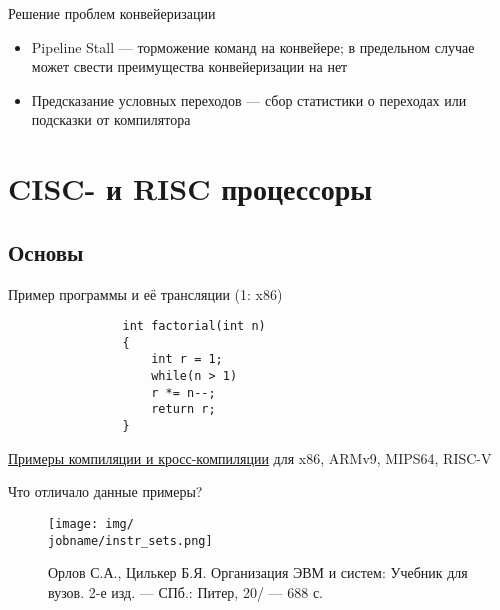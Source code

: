 \documentclass[xetex,aspectratio=43]{beamer}
\begin{document}
\begin{frame}{Решение проблем конвейеризации}
    \begin{itemize}
        \item Pipeline Stall — торможение команд на конвейере; в предельном случае может свести преимущества конвейеризации на нет
        \item Предсказание условных переходов — сбор статистики о переходах или подсказки от компилятора
    \end{itemize}
\end{frame}

\section{CISC- и RISC процессоры}

\subsection{Основы}

\begin{frame}[fragile]{Пример программы и её трансляции (1: x86)}
    \begin{center}
        \begin{minipage}{0.4\linewidth}
            \begin{verbatim}
                int factorial(int n)
                {
                    int r = 1;
                    while(n > 1)
                    r *= n--;
                    return r;
                }
            \end{verbatim}
        \end{minipage}
    \end{center}

\href{https://github.com/dluciv/Computer_Architecture-SPbU-CB.5080/tree/main/examples/cross-compiling}{Примеры компиляции и кросс-компиляции} для x86, ARMv9, MIPS64, RISC-V

\end{frame}

\begin{frame}{Что отличало данные примеры?}
    \begin{figure}
    \texttt{[image: img/\\jobname/instr\_sets.png]}
    \caption{Орлов С.А., Цилькер Б.Я. Организация ЭВМ и систем: Учебник для вузов. 2-е изд. — СПб.: Питер, 20\jobname/ — 688 с.}
    \end{figure}
\end{frame}
\end{document}
